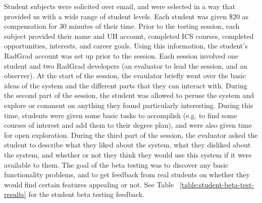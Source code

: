 Student subjects were solicited over email, and were selected in a way that provided us with a wide range of student levels. Each student was given \$20 as compensation for 30 minutes of their time. Prior to the testing session, each subject provided their name and UH account, completed ICS courses, completed opportunities, interests, and career goals. Using this information, the student's RadGrad account was set up prior to the session. Each session involved one student and two RadGrad developers (an evaluator to lead the session, and an observer). At the start of the session, the evaulator briefly went over the basic ideas of the system and the different parts that they can interact with. During the second part of the session, the student was allowed to peruse the system and explore or comment on anything they found particularly interesting. During this time, students were given some basic tasks to accomplish (e.g. to find some courses of interest and add them to their degree plan), and were also given time for open exploration. During the third part of the session, the evaluator asked the student to describe what they liked about the system, what they disliked about the system, and whether or not they think they would use this system if it were available to them. The goal of the beta testing was to discover any basic functionality problems, and to get feedback from real students on whether they would find certain features appealing or not. See Table ~\ref{table:student-beta-test-results} for the student beta testing feedback.

